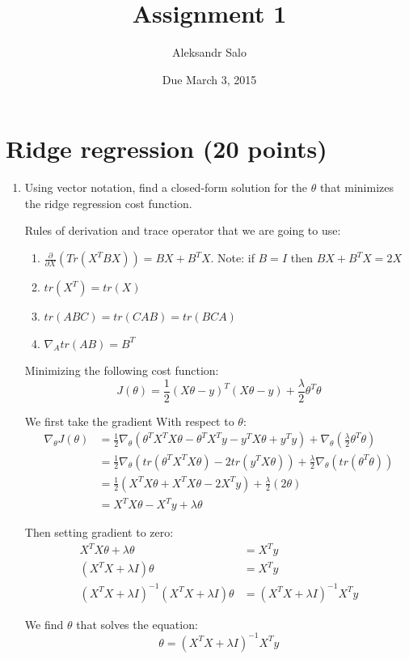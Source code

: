 \documentclass{article}
\title{Assignment 1}
\date{Due March 3, 2015}
\author{Aleksandr Salo}
\newcommand{\pathx}{\frac{\partial}{\partial X} }
\newcommand{\nath}{\nabla_\theta}
\begin{document}
\maketitle

\section{Ridge regression (20 points)}
	\begin{enumerate}
		\item  Using vector notation, find a closed-form solution for the $\theta$ that minimizes the ridge regression cost	function.
		
		Rules of derivation and trace operator that we are going to use:
		\begin{enumerate}
			\item $\pathx (Tr(X^T B X)) = BX + B^TX$. Note: if $B = I$ then  $BX + B^TX = 2X$
			\item $tr(X^T) = tr(X)$
			\item $tr(ABC) = tr(CAB) = tr(BCA)$
			\item $\nabla_A tr(AB) = B^T$
		\end{enumerate}
		
		Minimizing the following cost function:
		$$J(\theta) = \frac{1}{2} (X\theta - y)^T (X\theta - y) + \frac{\lambda}{2}\theta^T \theta$$
		
		We first take the gradient With respect to $\theta$:
		\begin{align*}
		\nath J(\theta) &= \frac{1}{2}\nabla_\theta (\theta^T X^T X\theta - \theta^TX^Ty - y^TX\theta + y^Ty)
		+ \nath (\frac{\lambda}{2}\theta^T \theta)\\
		&= \frac{1}{2}\nath (tr (\theta^T X^T X\theta) - 2tr(y^TX\theta)) + \frac{\lambda}{2}\nath(tr(\theta^T \theta))\\
		&= \frac{1}{2} (X^T X\theta + X^T X\theta - 2X^Ty) + \frac{\lambda}{2}(2\theta)\\
		&= X^T X \theta - X^Ty + \lambda\theta
		\end{align*}
		
		Then setting gradient to zero:
		\begin{align*}		
		X^T X \theta + \lambda\theta &= X^Ty \\
		(X^T X  + \lambda I) \theta &= X^Ty\\
		(X^T X  + \lambda I)^{-1} (X^T X  + \lambda I) \theta &= (X^T X  + \lambda I)^{-1} X^Ty		
		\end{align*}
		
		We find $\theta$ that solves the equation:
		$$ \theta = (X^T X  + \lambda I)^{-1} X^Ty $$
		

\end{enumerate}
\end{document}
